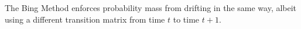 \documentclass[12pt]{article}
\begin{document}
The Bing Method enforces probability mass from drifting in the same way, albeit using a different transition matrix from time $t$ to time $t+1$.
 

%

%
%
%
%
%
%
%
%
%
%
%
%
%
\end{document}
